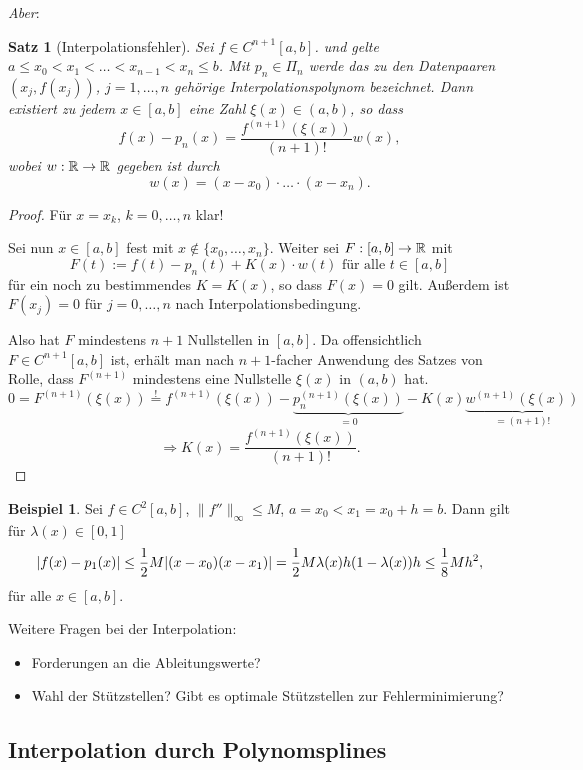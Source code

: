 \documentclass[
 a4paper,
 12pt,
 parskip=half
 ]{scrartcl}
\numberwithin{equation}{section}
\theoremstyle{plain}
\newtheorem{thm}{Satz}[section] %
\theoremstyle{definition}
\newtheorem{exmp}{Beispiel}[section] %
\numberwithin{equation}{section}
\begin{document}
\emph{Aber}:

\begin{thm}[Interpolationsfehler]
 Sei $f \in C^{n+1}[a,b]$. und gelte $a \le x_0 < x_1 < \ldots < x_{n-1} < x_n \le b$. Mit $p_n \in \Pi_n$ werde das zu den Datenpaaren $(x_j, f(x_j))$, $j=1, \ldots, n$ gehörige Interpolationspolynom bezeichnet. Dann existiert zu jedem $x \in [a,b]$ eine Zahl $\xi(x) \in (a,b)$, so dass
 \[ f(x) - p_n(x) = \frac{f^{(n+1)}(\xi(x))}{(n+1)!} w(x), \]
 wobei $w : \mathbb{R} \to \mathbb{R}$ gegeben ist durch
 \[ w(x) = (x-x_0) \cdot \ldots \cdot (x-x_n). \]
\end{thm}

\begin{proof}
 Für $x=x_k$, $k =0, \ldots, n$ klar!
 
 Sei nun $x \in [a,b]$ fest mit $x \notin \{ x_0, \ldots, x_n \}$. Weiter sei $F:[a,b] \to \mathbb{R}$ mit
 \[ F(t) := f(t) - p_n(t) + K(x) \cdot w(t) \text{ für alle } t \in [a,b] \]
 für ein noch zu bestimmendes $K = K(x)$, so dass $F(x) = 0$ gilt. Außerdem ist $F(x_j) = 0$ für $j = 0, \ldots, n$ nach Interpolationsbedingung.
 
 Also hat $F$ mindestens $n+1$ Nullstellen in $[a,b]$. Da offensichtlich $F \in C^{n+1}[a,b]$ ist, erhält man nach $n+1$-facher Anwendung des Satzes von Rolle, dass $F^{(n+1)}$ mindestens eine Nullstelle $\xi(x)$ in $(a,b)$ hat.
 \[ 0 = F^{(n+1)}(\xi(x)) \overset{!}{=} f^{(n+1)}(\xi(x)) - \underbrace{p_n^{(n+1)}(\xi(x))}_{=0} - K(x) \underbrace{w^{(n+1)}(\xi(x))}_{=(n+1)!} \]
 \[ \Rightarrow K(x) = \frac{f^{(n+1)}(\xi(x))}{(n+1)!}. \]
\end{proof}

\begin{exmp}
 Sei $f \in C^2[a,b]$, $\| f'' \|_\infty \le M$, $a = x_0 < x_1 = x_0 + h = b$. Dann gilt für $\lambda(x) \in [0,1]$
 \[ | f(x) - p_1(x) | \le \frac{1}{2} M | (x-x_0)(x-x_1) | = \frac{1}{2} M \lambda(x) h (1-\lambda(x)) h \le \frac{1}{8} M h^2, \]
 für alle $x \in [a,b]$.
\end{exmp}

Weitere Fragen bei der Interpolation:
\begin{itemize}
 \item Forderungen an die Ableitungswerte?
 \item Wahl der Stützstellen? Gibt es optimale Stützstellen zur Fehlerminimierung?
\end{itemize}

\subsection{Interpolation durch Polynomsplines}
\end{document}
